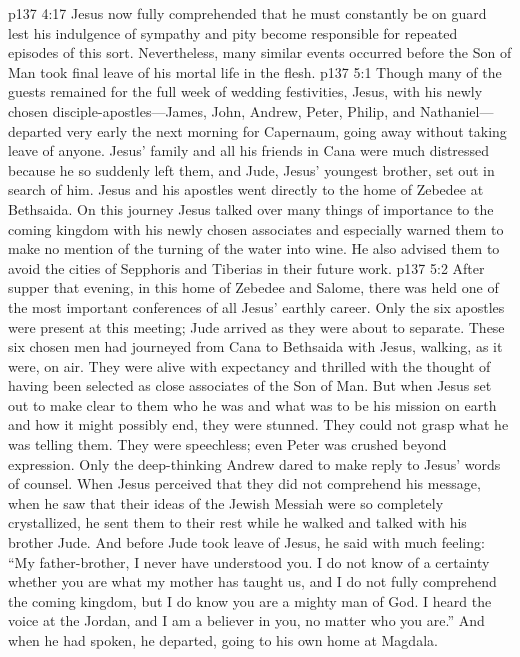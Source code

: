 \vs p137 4:17 Jesus now fully comprehended that he must constantly be on guard lest his indulgence of sympathy and pity become responsible for repeated episodes of this sort. Nevertheless, many similar events occurred before the Son of Man took final leave of his mortal life in the flesh.
\vs p137 5:1 Though many of the guests remained for the full week of wedding festivities, Jesus, with his newly chosen disciple\hyp{}apostles---James, John, Andrew, Peter, Philip, and Nathaniel---departed very early the next morning for Capernaum, going away without taking leave of anyone. Jesus’ family and all his friends in Cana were much distressed because he so suddenly left them, and Jude, Jesus’ youngest brother, set out in search of him. Jesus and his apostles went directly to the home of Zebedee at Bethsaida. On this journey Jesus talked over many things of importance to the coming kingdom with his newly chosen associates and especially warned them to make no mention of the turning of the water into wine. He also advised them to avoid the cities of Sepphoris and Tiberias in their future work.
\vs p137 5:2 After supper that evening, in this home of Zebedee and Salome, there was held one of the most important conferences of all Jesus’ earthly career. Only the six apostles were present at this meeting; Jude arrived as they were about to separate. These six chosen men had journeyed from Cana to Bethsaida with Jesus, walking, as it were, on air. They were alive with expectancy and thrilled with the thought of having been selected as close associates of the Son of Man. But when Jesus set out to make clear to them who he was and what was to be his mission on earth and how it might possibly end, they were stunned. They could not grasp what he was telling them. They were speechless; even Peter was crushed beyond expression. Only the deep\hyp{}thinking Andrew dared to make reply to Jesus’ words of counsel. When Jesus perceived that they did not comprehend his message, when he saw that their ideas of the Jewish Messiah were so completely crystallized, he sent them to their rest while he walked and talked with his brother Jude. And before Jude took leave of Jesus, he said with much feeling: “My father\hyp{}brother, I never have understood you. I do not know of a certainty whether you are what my mother has taught us, and I do not fully comprehend the coming kingdom, but I do know you are a mighty man of God. I heard the voice at the Jordan, and I am a believer in you, no matter who you are.” And when he had spoken, he departed, going to his own home at Magdala.
